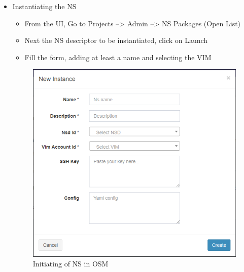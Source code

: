 \begin{itemize}
\item Instantiating the NS
\begin{itemize}
\item From the UI, Go to Projects --> Admin --> NS Packages (Open List)
\item Next the NS descriptor to be instantiated, click on Launch
\item Fill the form, adding at least a name and selecting the VIM
\end{itemize}
\begin{figure} [H]
	\centering
	\includegraphics[width=0.5\linewidth]{figures/sh5}
	\caption{Initiating of NS in OSM}
\end{figure}
\end{itemize}
